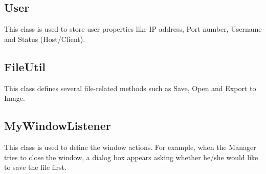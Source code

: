 \subsection{User}
This class is used to store user properties like IP address, Port number, Username and Status (Host/Client).

\subsection{FileUtil}
This class defines several file-related methods such as Save, Open and Export to Image.

\subsection{MyWindowListener}
This class is used to define the window actions. For example, when the Manager tries to close the window, a dialog box appears asking whether he/she would like to save the file first.
